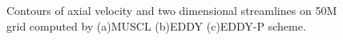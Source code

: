 \begin{figure}[t]
     \caption{Contours of axial velocity and two dimensional streamlines on 50M grid computed by (a)MUSCL (b)EDDY (c)EDDY-P scheme.}
     \label{w2} 
\end{figure}
